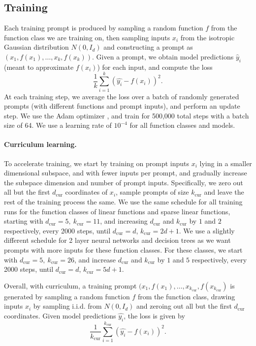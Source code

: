 \documentclass{article}
\begin{document}
\subsection{Training}
\label{app:training}
Each training prompt is produced by sampling a random function $f$ from the function class we are training on, then sampling inputs $x_i$ from the isotropic Gaussian distribution $N(0, I_d)$ and constructing a prompt as $(x_1, f(x_1),\ldots,x_k, f(x_{k}))$.
Given a prompt, we obtain model predictions $\hat y_i$ (meant to approximate $f(x_i)$) for each input, and compute the loss
\[
    \frac{1}{k} \sum_{i=1}^k \left(\hat{y_i}-f(x_i)\right)^2.
\]
At each training step, we average the loss over a batch of randomly generated prompts (with different functions and prompt inputs), and perform an update step.
We use the Adam optimizer \citep{kingma2014adam}, and train for 500,000 total steps with a batch size of 64. We use a learning rate of $10^{-4}$ for all function classes and models. 

\paragraph{Curriculum learning.} 
To accelerate training, we start by training on prompt inputs $x_i$ lying in a smaller dimensional subspace, and with fewer inputs per prompt, and gradually increase the subspace dimension and number of prompt inputs.
Specifically, we zero out all but the first $d_\text{cur}$ coordinates of $x_i$, sample prompts of size $k_\text{cur}$ and leave the rest of the training process the same.
We use the same schedule for all training runs for the function classes of linear functions and sparse linear functions, starting with $d_\text{cur} = 5,~ k_\text{cur} = 11$, and increasing $d_\text{cur}$ and $k_\text{cur}$ by $1$ and $2$ respectively, every 2000 steps, until $d_\text{cur} = d$, $k_\text{cur} = 2d+1$. We use a slightly different schedule for 2 layer neural networks and decision trees as we want prompts with more inputs for these function classes.
For these classes, we start with $d_\text{cur} = 5,~ k_\text{cur} = 26$, and increase $d_\text{cur}$ and $k_\text{cur}$ by $1$ and $5$ respectively, every 2000 steps, until $d_\text{cur} = d$, $k_\text{cur} = 5d+1$.

Overall, with curriculum, a training prompt $(x_1, f(x_1), \ldots, x_{k_\text{cur}}, f(x_{k_\text{cur}})$ is generated by sampling a random function $f$ from the function class,  drawing inputs $x_i$ by sampling i.i.d.  from $N(0, I_d)$ and zeroing out all but the first $d_\text{cur}$ coordinates. Given model predictions $\hat{y_i}$, the loss is given by 
\[
    \frac{1}{k_\text{cur}} \sum_{i=1}^{k_\text{cur}} \left(\hat{y_i}-f(x_i)\right)^2.
\]
\end{document}
